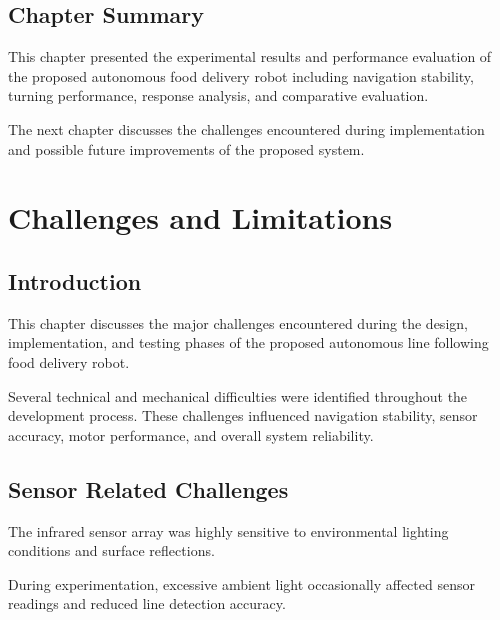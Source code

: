 \documentclass[12pt,a4paper,oneside]{report}
\begin{document}

\section{Chapter Summary}

This chapter presented the experimental results and performance evaluation of the proposed autonomous food delivery robot including navigation stability, turning performance, response analysis, and comparative evaluation.

The next chapter discusses the challenges encountered during implementation and possible future improvements of the proposed system.


\chapter{Challenges and Limitations}

\section{Introduction}

This chapter discusses the major challenges encountered during the design, implementation, and testing phases of the proposed autonomous line following food delivery robot.

Several technical and mechanical difficulties were identified throughout the development process. These challenges influenced navigation stability, sensor accuracy, motor performance, and overall system reliability.


\section{Sensor Related Challenges}

The infrared sensor array was highly sensitive to environmental lighting conditions and surface reflections.

During experimentation, excessive ambient light occasionally affected sensor readings and reduced line detection accuracy.
\end{document}
